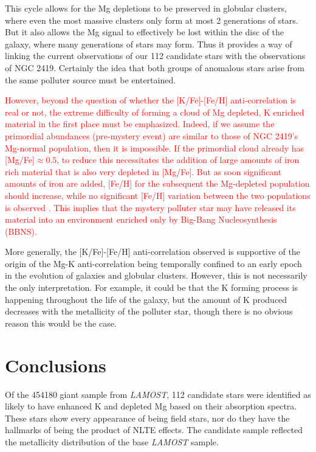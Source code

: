 \documentclass[a4paper,fleqn,usenatbib]{mnras}
\newcommand{\todo}[1]{\textcolor{red}{#1}}
\newcommand{\project}[1]{\emph{#1}}
\newcommand{\lamost}{\project{LAMOST}}
\begin{document}
This cycle allows for the Mg depletions to be preserved in globular clusters, where even the most massive clusters only form at most 2 generations of stars. But it also allows the Mg signal to effectively be lost within the disc of the galaxy, where many generations of stars may form. Thus it provides a way of linking the current observations of our 112 candidate stars with the observations of NGC 2419. Certainly the idea that both groups of anomalous stars arise from the same polluter source must be entertained.

\todo{However, beyond the question of whether the [K/Fe]-[Fe/H] anti-correlation is real or not, the extreme difficulty of forming a cloud of Mg depleted, K enriched material in the first place must be emphasized. Indeed, if we assume the primordial abundances (pre-mystery event) are similar to those of NGC 2419's Mg-normal population, then it is impossible. If the primordial cloud already has [Mg/Fe]$\approx 0.5$, to reduce this necessitates the addition of large amounts of iron rich material that is also very depleted in [Mg/Fe]. But as soon significant amounts of iron are added, [Fe/H] for the subsequent the Mg-depleted population should increase, while no significant [Fe/H] variation between the two populations is observed \citep{cohenkirby2012, mucciarelli2012}. This implies that the mystery polluter star may have released its material into an environment enriched only by Big-Bang Nucleosynthesis (BBNS).}

More generally, the [K/Fe]-[Fe/H] anti-correlation observed is supportive of the origin of the Mg-K anti-correlation being temporally confined to an early epoch in the evolution of galaxies and globular clusters. However, this is not necessarily the only interpretation. For example, it could be that the K forming process is happening throughout the life of the galaxy, but the amount of K produced decreases with the metallicity of the polluter star, though there is no obvious reason this would be the case.



\section{Conclusions}
\label{sec:conclusion}
Of the 454180 giant sample from \lamost, 112 candidate stars were identified as likely to have enhanced K and depleted Mg based on their absorption spectra. These stars show every appearance of being field stars, nor do they have the hallmarks of being the product of NLTE effects. The candidate sample reflected the metallicity distribution of the base \textit{LAMOST} sample.
\end{document}
